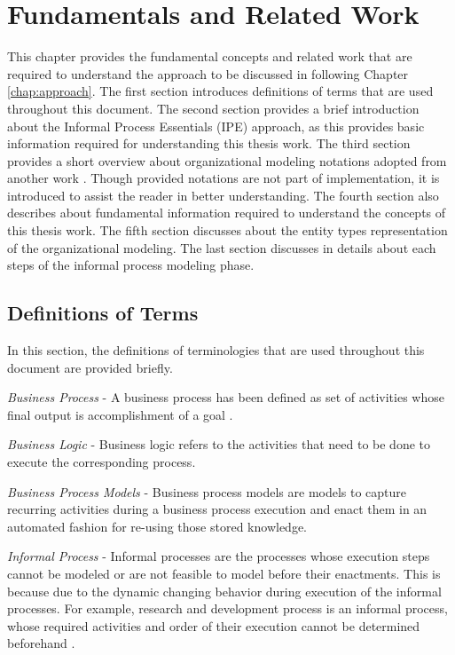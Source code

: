 \chapter{Fundamentals and Related Work}
\label{chap:fundamentals}
This chapter provides the fundamental concepts and related work that are required to understand the approach to be discussed in following Chapter \ref{chap:approach}. The first section introduces definitions of terms that are used throughout this document. The second section provides a brief introduction about the Informal Process Essentials (IPE) approach, as this provides basic information required for understanding this thesis work. The third section provides a short overview about organizational modeling notations adopted from another work \cite{Sierr2015}. Though provided notations are not part of implementation, it is introduced to assist the reader in better understanding. The fourth section also describes about fundamental information required to understand the concepts of this thesis work. The fifth section discusses about the entity types representation of the organizational modeling. The last section discusses in details about each steps of the informal process modeling phase. 

\section{Definitions of Terms}
\label{sec:termdefinitions}
In this section, the definitions of terminologies that are used throughout this document are provided briefly.

\textit{Business Process} -  A business process has been defined as set of activities whose final output is accomplishment of a goal \cite{Weske2012}.  

\textit{Business Logic} - Business logic refers to the activities that need to be done to execute the corresponding process. 

\textit{Business Process Models} - Business process models are models to capture recurring activities during a business process execution and enact them in an automated fashion for re-using those stored knowledge. 

\textit{Informal Process} - Informal processes are the processes whose execution steps cannot be modeled or are not feasible to model before their enactments. This is because due to the dynamic changing behavior during execution of the informal processes.  For example, research and development process is an informal process, whose required activities and order of their execution cannot be determined beforehand \cite{Sungur2015}.    

